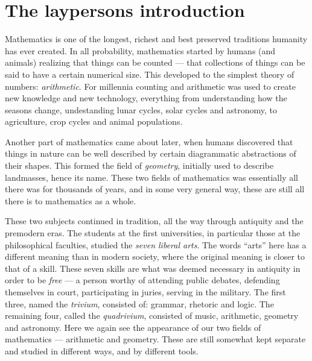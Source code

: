 
\section{The laypersons introduction}

Mathematics is one of the longest, richest and best preserved traditions humanity has ever created. In all probability, mathematics started by humans (and animals) realizing that things can be counted --- that collections of things can be said to have a certain numerical size. This developed to the simplest theory of numbers: \emph{arithmetic}. For millennia counting and arithmetic was used to create new knowledge and new technology, everything from understanding how the seasons change, undestanding lunar cycles, solar cycles and astronomy, to agriculture, crop cycles and animal populations. 

Another part of mathematics came about later, when humans discovered that things in nature can be well described by certain diagrammatic abstractions of their shapes. This formed the field of \emph{geometry}, initially used to describe landmasses, hence its name. These two fields of mathematics was essentially all there was for thousands of years, and in some very general way, these are still all there is to mathematics as a whole. 

These two subjects continued in tradition, all the way through antiquity and the premodern eras. The students at the first universities, in particular those at the philosophical faculties, studied the \emph{seven liberal arts}. The words ``arts'' here has a different meaning than in modern society, where the original meaning is closer to that of a skill. These seven skills are what was deemed necessary in antiquity in order to be \emph{free} --- a person worthy of attending public debates, defending themselves in court, participating in juries, serving in the military. The first three, named the \emph{trivium}, consisted of: grammar, rhetoric and logic. The remaining four, called the \emph{quadrivium}, consisted of music, arithmetic, geometry and astronomy. Here we again see the appearance of our two fields of mathematics --- arithmetic and geometry. These are still somewhat kept separate and studied in different ways, and by different tools. 

